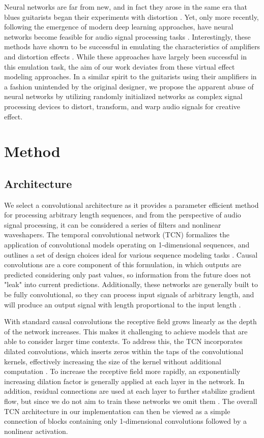 \documentclass{article}
\begin{document}
Neural networks are far from new, and in fact they arose in the same era that blues guitarists began their experiments with distortion \cite{schmidhuber2015deep}.
Yet, only more recently, following the emergence of modern deep learning approaches, 
have neural networks become feasible for audio signal processing tasks \cite{purwins2019deep}.
Interestingly, these methods have shown to be successful in emulating the characteristics of amplifiers and distortion effects 
\cite{schmitz2018nonlinear, zhang2018lstm, damskagg2019distortion, martinez2019nonlinear}.
While these approaches have largely been successful in this emulation task, the aim of our work deviates from these virtual effect modeling approaches.
In a similar spirit to the guitarists using their amplifiers in a fashion unintended by the original designer,
we propose the apparent abuse of neural networks by utilizing randomly initialized networks as complex signal processing devices
to distort, transform, and warp audio signals for creative effect. 

\section{Method}
\subsection{Architecture}

We select a convolutional architecture as it provides a parameter efficient method for processing arbitrary length sequences, 
and from the perspective of audio signal processing, it can be considered a series of filters and nonlinear waveshapers.
The temporal convolutional network (TCN) formalizes the application of convolutional models operating on 1-dimensional sequences,
and outlines a set of design choices ideal for various sequence modeling tasks \cite{bai2018tcn}. 
Causal convolutions are a core component of this formulation, in which outputs are predicted considering only past values,
so information from the future does not "leak" into current predictions. 
Additionally, these networks are generally built to be fully convolutional, 
so they can process input signals of arbitrary length, and will produce an output signal with length proportional to the input length \cite{long2015fcn}.

With standard causal convolutions the receptive field grows linearly as the depth of the network increases. 
This makes it challenging to achieve models that are able to consider larger time contexts. 
To address this, the TCN incorporates dilated convolutions, which inserts zeros within the taps of the convolutional kernels, 
effectively increasing the size of the kernel without additional computation \cite{oord2016wavenet}. 
To increase the receptive field more rapidly, an exponentially increasing dilation factor is generally applied at each layer in the network. 
In addition, residual connections are used at each layer to further stabilize gradient flow, 
but since we do not aim to train these networks we omit them \cite{he2016deep}.
The overall TCN architecture in our implementation can then be viewed as a simple connection of blocks containing
only 1-dimensional convolutions followed by a nonlinear activation. 
\end{document}
